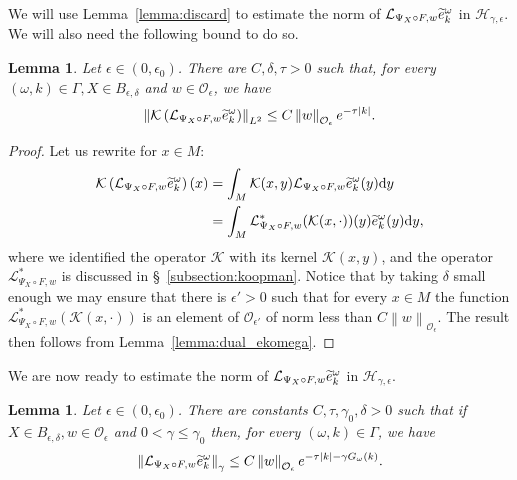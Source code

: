 \documentclass[10pt]{amsart}
\newtheorem{lemm}[theo]{Lemma}\newtheorem{prop}[theo]{Proposition}\newtheorem{coro}[theo]{Corollary}\newtheorem{conj}[theo]{Conjecture}
\theoremstyle{definition}\newtheorem{defi}[theo]{Definition}\newtheorem{rema}[theo]{Remark}\newtheorem{exam}[theo]{Example}\newtheorem{exem}[theo]{Example}\newtheorem{nota}[theo]{Notation}
\newcommand{\n}[1]{\left\|#1\right\|}
\newcommand{\va}[1]{\left|#1\right|}
\newcommand{\clO}{\mathcal{O}}
\newcommand{\clL}{\mathcal{L}}
\newcommand{\clH}{\mathcal{H}}
\newcommand{\clK}{\mathcal{K}}
\newcommand{\rmd}{\mathrm{d}}
\let\oldtilde\tilde
\renewcommand*{\tilde}[1]{\mathchoice{\widetilde{#1}}{\widetilde{#1}}{\oldtilde{#1}}{\oldtilde{#1}}}
\begin{document}
We will use Lemma~\ref{lemma:discard} to estimate the norm of $\clL_{\Psi_X \circ F,w} \tilde{e}_k^\omega$ in $\clH_{\gamma,\epsilon}$. We will also need the following bound to do so.

\begin{lemm}\label{lemma:estimee_analytic_rest}
Let $\epsilon \in(0,\epsilon_0)$. There are $C,\delta, \tau >0$ such that, for every $(\omega,k) \in \Gamma, X \in B_{\epsilon,\delta}$ and $w \in \clO_\epsilon$, we have
\begin{equation*}
\n{\clK \left(\clL_{\Psi_X \circ F,w} \tilde{e}_{k}^\omega\right)}_{L^2} \leq C \n{w}_{\clO_\epsilon} e^{- \tau \va{k}}.
\end{equation*}
\end{lemm}

\begin{proof}
Let us rewrite for $x \in M$:
\begin{equation*}
\begin{split}
\clK \left(\clL_{\Psi_X \circ F,w} \tilde{e}_{k}^\omega\right) (x) & = \int_M \clK (x,y) \clL_{\Psi_X \circ F,w} \tilde{e}_{k}^\omega(y) \rmd y \\
& = \int_M \clL_{\Psi_X \circ F,w}^* (\clK (x,\cdot))(y) \tilde{e}_{k}^\omega(y) \rmd y,
\end{split}
\end{equation*}
where we identified the operator $\clK $ with its kernel $\clK (x,y)$, and the operator $\clL_{\Psi_X \circ F,w}^*$ is discussed in \S~\ref{subsection:koopman}. Notice that by taking $\delta$ small enough we may ensure that there is $\epsilon' > 0$ such that for every $x \in M$ the function $\clL_{\Psi_X \circ F,w}^* (\clK (x,\cdot))$ is an element of $\clO_{\epsilon'}$ of norm less than $C \n{w}_{\clO_\epsilon}$. The result then follows from Lemma~\ref{lemma:dual_ekomega}.
\end{proof}

We are now ready to estimate the norm of $\clL_{\Psi_X \circ F,w}
\tilde{e}_k^\omega$ in $\clH_{\gamma,\epsilon}$.

\begin{lemm}\label{lemma:individual_bound}
Let $\epsilon \in (0,\epsilon_0)$. There are constants $C,\tau,\gamma_0,\delta > 0$ such that if $X \in B_{\epsilon,\delta}, w \in \clO_\epsilon$ and $0 < \gamma \leq \gamma_0$ then, for every $(\omega,k) \in \Gamma$, we have
\begin{equation*}
\n{\clL_{\Psi_X \circ F,w} \tilde{e}_{k}^\omega}_\gamma \leq C \n{w}_{\clO_\epsilon} e^{- \tau \va{k} - \gamma G_\omega(k)}.
\end{equation*}
\end{lemm}
\end{document}
